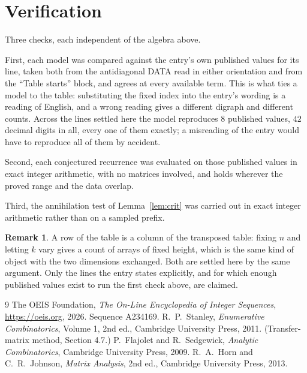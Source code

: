 \documentclass[11pt,a4paper]{article}
\theoremstyle{plain}
\theoremstyle{definition}
\newtheorem{remark}[theorem]{Remark}
\begin{document}
\section{Verification}

Three checks, each independent of the algebra above.

First, each model was compared against the entry's own published values for its line, taken
both from the antidiagonal DATA read in either orientation and from the ``Table starts''
block, and agrees at every available term. This is what ties a model to the table:
substituting the fixed index into the entry's wording is a reading of English, and a wrong
reading gives a different digraph and different counts. Across the lines settled here the
model reproduces $8$ published values, $42$ decimal digits in all, every one of
them exactly; a misreading of the entry would have to reproduce all of them by accident.

Second, each conjectured recurrence was evaluated on those published values in exact
integer arithmetic, with no matrices involved, and holds wherever the proved range and the
data overlap.

Third, the annihilation test of Lemma~\ref{lem:crit} was carried out in exact integer
arithmetic rather than on a sampled prefix.

\begin{remark}
A row of the table is a column of the transposed table: fixing $n$ and letting $k$ vary gives a
count of arrays of fixed height, which is the same kind of object with the two dimensions
exchanged. Both are settled here by the same argument. Only the lines the entry states
explicitly, and for which enough published values exist to run the first check above, are
claimed.
\end{remark}

\begin{thebibliography}{9}
 The OEIS Foundation, \emph{The On-Line Encyclopedia of Integer
Sequences}, \url{https://oeis.org}, 2026. Sequence A234169.
 R.~P.~Stanley, \emph{Enumerative Combinatorics}, Volume 1, 2nd ed.,
Cambridge University Press, 2011. (Transfer-matrix method, Section 4.7.)
 P.~Flajolet and R.~Sedgewick, \emph{Analytic Combinatorics}, Cambridge
University Press, 2009.
 R.~A.~Horn and C.~R.~Johnson, \emph{Matrix Analysis}, 2nd ed., Cambridge
University Press, 2013.
\end{thebibliography}
\end{document}
